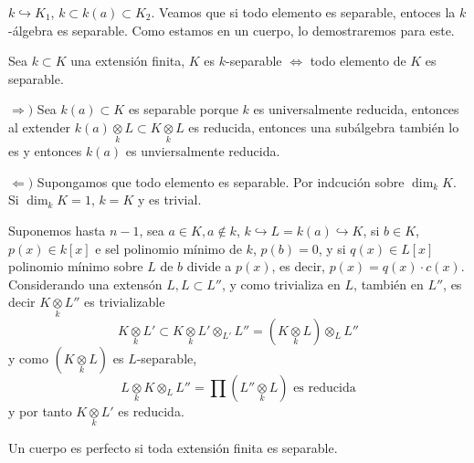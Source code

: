 \begin{dem}
    $k \hookrightarrow K_1$, $k \subset k(a)\subset K_2$. Veamos que si todo elemento es separable, entoces la $k$-\'algebra es separable. Como estamos en un cuerpo, lo demostraremos para este. 
\end{dem}
\begin{prop}
    Sea $k \subset K$ una extensi\'on finita, $K$ es $k$-separable $\iff$ todo elemento de $K$ es separable.
\end{prop}
\begin{dem}
    $\Rightarrow)$ Sea $k(a) \subset K$ es separable porque $k$ es universalmente reducida, entonces al extender $k(a) \underset{k}{\otimes} L \subset K \underset{k}{\otimes} L$ es reducida, entonces una sub\'algebra tambi\'en lo es y entonces $k(a)$ es unviersalmente reducida. 

    $\Leftarrow)$ Supongamos que todo elemento es separable. Por indcuci\'on sobre $\dim_k K$. Si $\dim_k K = 1$, $k=K$ y es trivial.

    Suponemos hasta $n-1$, sea $a\in K, a\nin k$, $k \hookrightarrow L=k(a) \hookrightarrow K$, si $b \in K$, $p(x)\in k[x]$ e sel polinomio m\'inimo de $k$, $p(b)=0$, y si $q(x) \in L[x]$ polinomio m\'inimo sobre $L$ de $b$ divide a $p(x)$, es decir, $p(x) = q(x) \cdot c(x)$. Considerando una extens\'on $L,L\subset L''$, y como trivializa en $L$, tambi\'en en $L''$, es decir $K \underset{k}{\otimes} L''$ es trivializable
    $$K \underset{k}{\otimes} L' \subset K\underset{k}{\otimes} L' \otimes_{L'} L'' = (K \underset{k}{\otimes} L)\otimes_L L ''$$
    y como $(K \underset{k}{\otimes} L)$ es $L$-separable, 
    $$L\underset{k}{\otimes} K \otimes_L L'' = \prod (L'' \underset{k}{\otimes} L) \text{ es reducida}$$
    y por tanto $K \underset{k}{\otimes} L'$ es reducida. 
\end{dem}
\begin{defi}
    Un cuerpo es perfecto si toda extensi\'on finita es separable. 
\end{defi}

